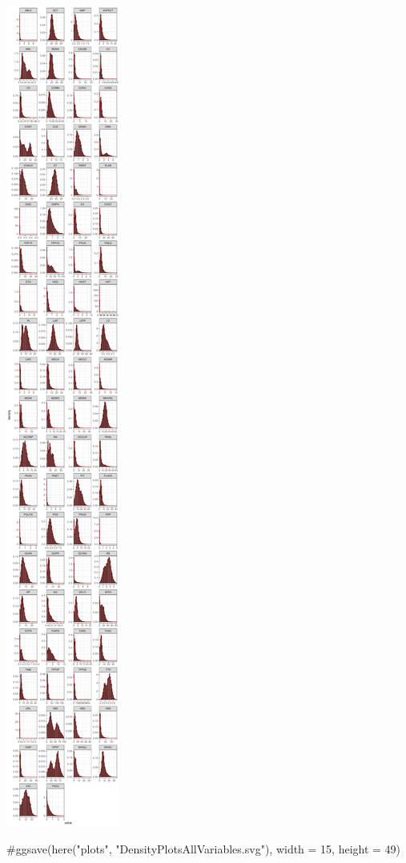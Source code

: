 \documentclass[
  letterpaper,
  DIV=11,
  numbers=noendperiod]{scrreprt}
\newenvironment{Shaded}{\begin{snugshade}}{\end{snugshade}}
\newcommand{\CommentTok}[1]{\textcolor[rgb]{0.37,0.37,0.37}{#1}}
\begin{document}
\includegraphics{AppendixG_files/figure-pdf/distribution-viz-1.pdf}

\begin{Shaded}
\begin{Highlighting}[]
\CommentTok{\#ggsave(here("plots", "DensityPlotsAllVariables.svg"), width = 15, height = 49)}
\end{Highlighting}
\end{Shaded}
\end{document}
